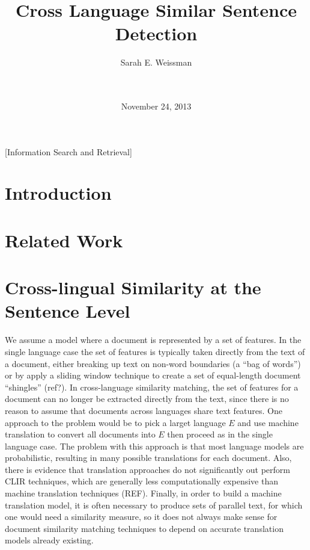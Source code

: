\documentclass{acm_proc_article-sp}
\begin{document}
\title{Cross Language Similar Sentence Detection}


\author{
\alignauthor Sarah E. Weissman\\
       \\
       \\
}

\date{November 24, 2013}

\maketitle
\begin{abstract}
\end{abstract}

[Information Search and Retrieval]


\section{Introduction}

\section{Related Work}

\section{Cross-lingual Similarity at the Sentence Level}

We assume a model where a document is represented by a set of features. In the single language case the set of features is typically taken directly from the text of a document, either breaking up text on non-word boundaries (a ``bag of words'') or by apply a sliding window technique to create a set of equal-length document ``shingles'' (ref?). In cross-language similarity matching, the set of features for a document can no longer be extracted directly from the text, since there is no reason to assume that documents across languages share text features. One approach to the problem would be to pick a larget language $E$ and use machine translation to convert all documents into $E$ then proceed as in the single language case. The problem with this approach is that most language models are probabilistic, resulting in many possible translations for each document. Also, there is evidence that translation approaches do not significantly out perform CLIR techniques, which are generally less computationally expensive than machine translation techniques (REF). Finally, in order to build a machine translation model, it is often necessary to produce sets of parallel text, for which one would need a similarity measure, so it does not always make sense for document similarity matching techniques to depend on accurate translation models already existing.
\end{document}

